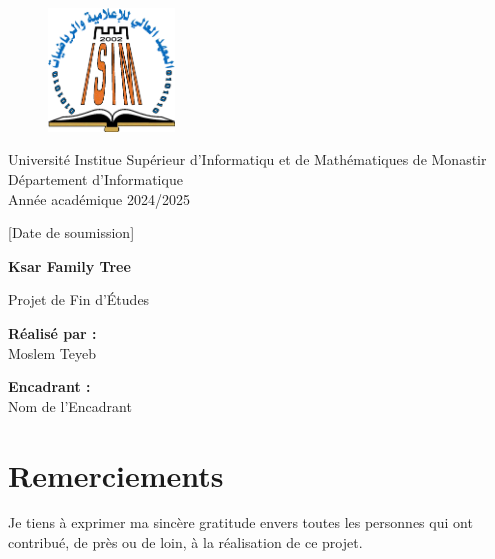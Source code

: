 \documentclass[a4paper,12pt]{report}
\begin{document}
	
	\begin{titlepage}
		\centering
		\vspace*{1cm}
		
		\begin{figure}[h]
			\centering
			\includegraphics[width=0.3\textwidth]{ISIMM.png} %
		\end{figure}
		
		\vspace{1cm}
			\Large
		Université Institue Supérieur d'Informatiqu et de Mathématiques de Monastir \\
		Département d'Informatique \\
		Année académique 2024/2025
		
		\vspace{0.8cm}
		
		\Large
		[Date de soumission]
		
		\Huge
		\textbf{Ksar Family Tree}
		
		\vspace{0.5cm}
		\LARGE
		Projet de Fin d'Études
		
		\vspace{1.5cm}
		
		\textbf{Réalisé par :} \\
		\Large Moslem Teyeb
		
		\vspace{1cm}
		
		\textbf{Encadrant :} \\
		\Large Nom de l'Encadrant
		
		\vfill
		
	
	
	\end{titlepage}
	\tableofcontents
	\chapter*{Remerciements}
	
	Je tiens à exprimer ma sincère gratitude envers toutes les personnes qui ont contribué, de près ou de loin, à la réalisation de ce projet.
	
\end{document}
